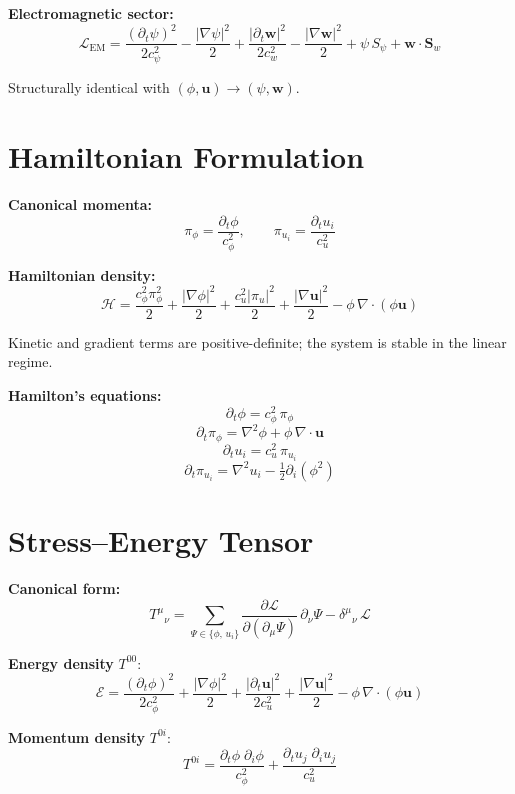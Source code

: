 \documentclass[10pt,twocolumn]{article}
\begin{document}
\textbf{Electromagnetic sector:}
\[
  \mathcal{L}_{\mathrm{EM}} =
  \frac{(\partial_t\psi)^2}{2c_\psi^2}
  - \frac{|\nabla\psi|^2}{2}
  + \frac{|\partial_t\mathbf w|^2}{2c_w^2}
  - \frac{|\nabla\mathbf w|^2}{2}
  + \psi\,S_\psi + \mathbf w\cdot\mathbf S_w
\]

Structurally identical with $(\phi,\mathbf u) \to (\psi,\mathbf w)$.

\section{Hamiltonian Formulation}

\textbf{Canonical momenta:}
\[
  \pi_\phi = \frac{\partial_t\phi}{c_\phi^2}, \qquad
  \pi_{u_i} = \frac{\partial_t u_i}{c_u^2}
\]

\textbf{Hamiltonian density:}
\[
  \mathcal{H} =
  \frac{c_\phi^2\pi_\phi^2}{2}
  + \frac{|\nabla\phi|^2}{2}
  + \frac{c_u^2|\pi_u|^2}{2}
  + \frac{|\nabla\mathbf u|^2}{2}
  - \phi\,\nabla\cdot(\phi\mathbf u)
\]

Kinetic and gradient terms are positive-definite; the system is stable in the linear regime.

\textbf{Hamilton's equations:}
\[
  \partial_t\phi = c_\phi^2\,\pi_\phi
\]
\[
  \partial_t\pi_\phi = \nabla^2\phi + \phi\,\nabla\cdot\mathbf u
\]
\[
  \partial_t u_i = c_u^2\,\pi_{u_i}
\]
\[
  \partial_t\pi_{u_i} = \nabla^2 u_i - \tfrac{1}{2}\partial_i(\phi^2)
\]

\section{Stress--Energy Tensor}

\textbf{Canonical form:}
\[
  T^{\mu}{}_{\nu}
  = \sum_{\Psi\in\{\phi,\,u_i\}}
    \frac{\partial\mathcal{L}}{\partial(\partial_\mu\Psi)}\,\partial_\nu\Psi
    - \delta^{\mu}{}_{\nu}\,\mathcal{L}
\]

\textbf{Energy density} $T^{00}$:
\[
  \mathcal{E} =
  \frac{(\partial_t\phi)^2}{2c_\phi^2}
  + \frac{|\nabla\phi|^2}{2}
  + \frac{|\partial_t\mathbf u|^2}{2c_u^2}
  + \frac{|\nabla\mathbf u|^2}{2}
  - \phi\,\nabla\cdot(\phi\mathbf u)
\]

\textbf{Momentum density} $T^{0i}$:
\[
  T^{0i} =
  \frac{\partial_t\phi\;\partial_i\phi}{c_\phi^2}
  + \frac{\partial_t u_j\;\partial_i u_j}{c_u^2}
\]
\end{document}
